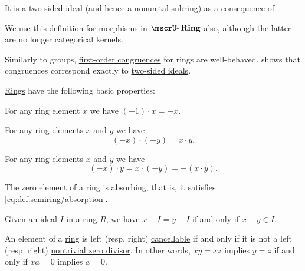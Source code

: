 \begin{definition}
\begin{thmenum}
    It is a \hyperref[def:semiring_ideal]{two-sided ideal} (and hence a nonunital subring) as a consequence of .

    We use this definition for morphisms in \( \ucat{Ring} \) also, although the latter are no longer categorical kernels.

    \mimprovised Similarly to groups, \hyperref[def:first_order_congruence]{first-order congruences} for rings are well-behaved.  shows that congruences correspond exactly to \hyperref[def:semiring_ideal]{two-sided ideals}.
  \end{thmenum}
\end{definition}

\begin{proposition}\label{thm:def:ring}
  \hyperref[def:ring]{Rings} have the following basic properties:
  \begin{thmenum}
     For any ring element \( x \) we have \( (-1) \cdot x = -x \).

     For any ring elements \( x \) and \( y \) we have
    \begin{equation}\label{eq:thm:def:ring/multiplication_even_sign}
      (-x) \cdot (-y) = x \cdot y.
    \end{equation}

     For any ring elements \( x \) and \( y \) we have
    \begin{equation}\label{eq:thm:def:ring/multiplication_odd_sign}
      (-x) \cdot y = x \cdot (-y) = -(x \cdot y).
    \end{equation}

     The zero element of a ring is absorbing, that is, it satisfies \eqref{eq:def:semiring/absorption}.

     Given an \hyperref[def:semiring_ideal]{ideal} \( I \) in a \hyperref[def:ring]{ring} \( R \), we have \( x + I = y + I \) if and only if \( x - y \in I \).

     An element of a \hyperref[def:ring]{ring} is left (resp. right) \hyperref[def:binary_operation/cancellative]{cancellable} if and only if it is not a left (resp. right) \hyperref[def:divisibility/zero]{nontrivial zero divisor}. In other words, \( xy = xz \) implies \( y = z \) if and only if \( xa = 0 \) implies \( a = 0 \).


\end{thmenum}
\end{proposition}
